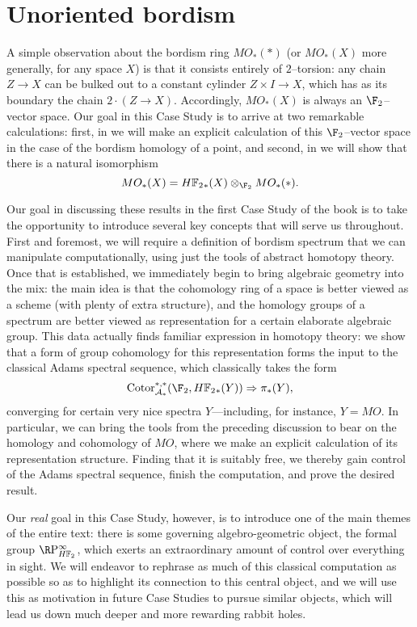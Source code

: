 
\chapter{Unoriented bordism}\label{UnorientedBordismChapter}




A simple observation about the bordism ring $MO_*(*)$ (or $MO_*(X)$ more generally, for any space $X$) is that it consists entirely of $2$--torsion: any chain $Z \to X$ can be bulked out to a constant cylinder $Z \times I \to X$, which has as its boundary the chain $2 \cdot (Z \to X)$.  Accordingly, $MO_*(X)$ is always an $\F_2$--vector space.  Our goal in this Case Study is to arrive at two remarkable calculations: first, in  we will make an explicit calculation of this $\F_2$--vector space in the case of the bordism homology of a point, and second, in  we will show that there is a natural isomorphism \[MO_*(X) = \HFtwo_*(X) \otimes_{\F_2} MO_*(*).\]

Our goal in discussing these results in the first Case Study of the book is to take the opportunity to introduce several key concepts that will serve us throughout.  First and foremost, we will require a definition of bordism spectrum that we can manipulate computationally, using just the tools of abstract homotopy theory.  Once that is established, we immediately begin to bring algebraic geometry into the mix: the main idea is that the cohomology ring of a space is better viewed as a scheme (with plenty of extra structure), and the homology groups of a spectrum are better viewed as representation for a certain elaborate algebraic group.  This data actually finds familiar expression in homotopy theory: we show that a form of group cohomology for this representation forms the input to the classical Adams spectral sequence, which classically takes the form \[\Cotor_{\mathcal A_*}^{*, *}(\F_2, \HFtwo_*(Y)) \Rightarrow \pi_*(Y),\] converging for certain very nice spectra $Y$---including, for instance, $Y = MO$.  In particular, we can bring the tools from the preceding discussion to bear on the homology and cohomology of $MO$, where we make an explicit calculation of its representation structure.  Finding that it is suitably free, we thereby gain control of the Adams spectral sequence, finish the computation, and prove the desired result.

Our \emph{real} goal in this Case Study, however, is to introduce one of the main themes of the entire text: there is some governing algebro-geometric object, the formal group $\RP^\infty_{\HFtwo}$, which exerts an extraordinary amount of control over everything in sight.  We will endeavor to rephrase as much of this classical computation as possible so as to highlight its connection to this central object, and we will use this as motivation in future Case Studies to pursue similar objects, which will lead us down much deeper and more rewarding rabbit holes.






